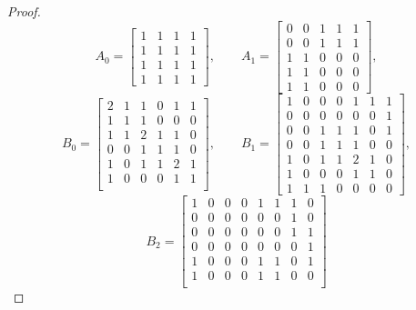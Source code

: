 \documentclass{article}
\theoremstyle{definition}
\begin{document}
\begin{proof}
\[
    A_0 = \begin{bmatrix}
        1 & 1 & 1 & 1 \\
        1 & 1 & 1 & 1 \\
        1 & 1 & 1 & 1 \\
        1 & 1 & 1 & 1 
    \end{bmatrix}, \qquad
    A_1 = \begin{bmatrix}
        0 & 0 & 1 & 1 & 1 \\
        0 & 0 & 1 & 1 & 1 \\
        1 & 1 & 0 & 0 & 0 \\
        1 & 1 & 0 & 0 & 0 \\
        1 & 1 & 0 & 0 & 0
    \end{bmatrix}, 
\]
\[
    B_0 = \begin{bmatrix}
        2 & 1 & 1 & 0 & 1 & 1 \\
        1 & 1 & 1 & 0 & 0 & 0 \\
        1 & 1 & 2 & 1 & 1 & 0 \\
        0 & 0 & 1 & 1 & 1 & 0 \\
        1 & 0 & 1 & 1 & 2 & 1 \\
        1 & 0 & 0 & 0 & 1 & 1 \\
    \end{bmatrix}, \qquad
    B_1 = \begin{bmatrix}
        1 & 0 & 0 & 0 & 1 & 1 & 1 \\
        0 & 0 & 0 & 0 & 0 & 0 & 1 \\
        0 & 0 & 1 & 1 & 1 & 0 & 1 \\
        0 & 0 & 1 & 1 & 1 & 0 & 0 \\
        1 & 0 & 1 & 1 & 2 & 1 & 0 \\
        1 & 0 & 0 & 0 & 1 & 1 & 0 \\
        1 & 1 & 1 & 0 & 0 & 0 & 0
    \end{bmatrix},
\]
\[
    B_2 = \begin{bmatrix}
        1 & 0 & 0 & 0 & 1 & 1 & 1 & 0 \\
        0 & 0 & 0 & 0 & 0 & 0 & 1 & 0 \\
        0 & 0 & 0 & 0 & 0 & 0 & 1 & 1 \\
        0 & 0 & 0 & 0 & 0 & 0 & 0 & 1 \\
        1 & 0 & 0 & 0 & 1 & 1 & 0 & 1 \\
        1 & 0 & 0 & 0 & 1 & 1 & 0 & 0 \\

\end{bmatrix}\]
\end{proof}
\end{document}
